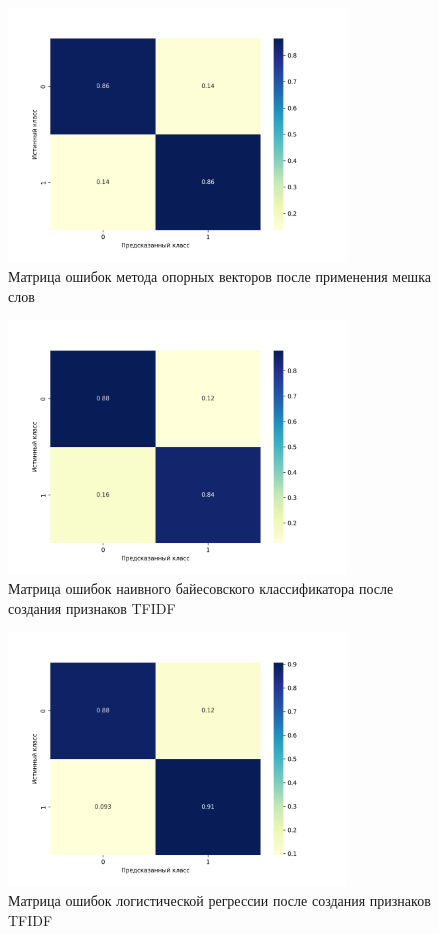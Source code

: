 \documentclass[bachelor, och, coursework]{SCWorks}
\begin{document}
        \begin{figure}[H]
            \centering
            \includegraphics[width=0.8\textwidth]{pic/BOW-SVM.png}
            \caption{Матрица ошибок метода опорных векторов после применения мешка слов}
        \end{figure}

        \begin{figure}[H]
            \centering
            \includegraphics[width=0.8\textwidth]{pic/TFIDF-NB.png}
            \caption{Матрица ошибок наивного байесовского классификатора после создания признаков TFIDF}
        \end{figure}

        \begin{figure}[H]
            \centering
            \includegraphics[width=0.8\textwidth]{pic/TFIDF-LR.png}
            \caption{Матрица ошибок логистической регрессии после создания признаков TFIDF}
        \end{figure}
\end{document}

